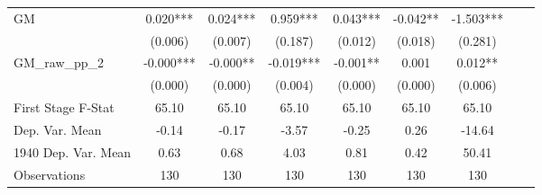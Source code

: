 \begin{tabular}{l*{8}{c}}
GM              &    0.020***&    0.024***&    0.959***&    0.043***&   -0.042** &   -1.503***\\
                &  (0.006)   &  (0.007)   &  (0.187)   &  (0.012)   &  (0.018)   &  (0.281)   \\
\addlinespace
GM\_raw\_pp\_2     &   -0.000***&   -0.000** &   -0.019***&   -0.001** &    0.001   &    0.012** \\
                &  (0.000)   &  (0.000)   &  (0.004)   &  (0.000)   &  (0.000)   &  (0.006)   \\
\midrule
First Stage F-Stat&    65.10   &    65.10   &    65.10   &    65.10   &    65.10   &    65.10   \\
Dep. Var. Mean  &    -0.14   &    -0.17   &    -3.57   &    -0.25   &     0.26   &   -14.64   \\
1940 Dep. Var. Mean&     0.63   &     0.68   &     4.03   &     0.81   &     0.42   &    50.41   \\
Observations    &      130   &      130   &      130   &      130   &      130   &      130   \\
       \bottomrule \end{tabular}
